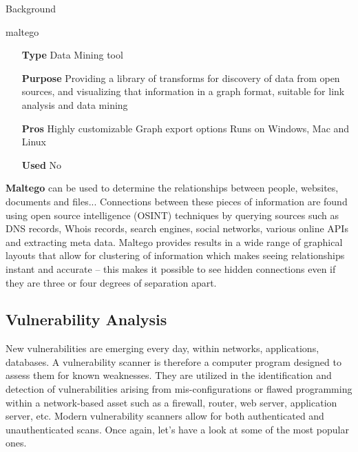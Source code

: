 \begin{chaptercover}{Background}
\begin{solutiondata}{maltego}
\begin{itemize}[labelsep=1cm]
  \item [\textbf{Type}] Data Mining tool
  \item [\textbf{Purpose}] Providing a library of transforms for discovery of data from open sources, and visualizing that information in a graph format, suitable for link analysis and data mining
  \item [\textbf{Pros}] Highly customizable \newline Graph export options \newline Runs on Windows, Mac and Linux
  \item [\textbf{Used}] No
\end{itemize}
\end{solutiondata}

\textbf{Maltego} \cite{maltego} can be used to determine the relationships between people, websites, documents and files... Connections between these pieces of information are found using open source intelligence (OSINT) techniques by querying sources such as DNS records, Whois records, search engines, social networks, various online APIs and extracting meta data. Maltego provides results in a wide range of graphical layouts that allow for clustering of information which makes seeing relationships instant and accurate – this makes it possible to see hidden connections even if they are three or four degrees of separation apart.

\subsection{Vulnerability Analysis}

New vulnerabilities are emerging every day, within networks, applications, databases. A vulnerability scanner is therefore a computer program designed to assess them for known weaknesses. They are utilized in the identification and detection of vulnerabilities arising from mis-configurations or flawed programming within a network-based asset such as a firewall, router, web server, application server, etc. Modern vulnerability scanners allow for both authenticated and unauthenticated scans. Once again, let’s have a look at some of the most popular ones.


\end{chaptercover}
